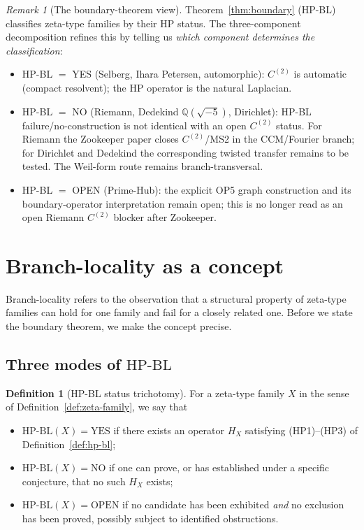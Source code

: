 \documentclass[11pt]{article}
\theoremstyle{definition}
\newtheorem{definition}[theorem]{Definition}
\theoremstyle{remark}
\newtheorem{remark}[theorem]{Remark}
\newcommand{\HBL}{\mathrm{HP\text{-}BL}}
\begin{document}
\begin{remark}[The boundary-theorem view]
\label{rem:boundary-three-component}
Theorem~\ref{thm:boundary} (HP-BL) classifies zeta-type families
by their HP status. The three-component decomposition refines this
by telling us \emph{which component determines the classification}:
\begin{itemize}
\item HP-BL $=$ YES (Selberg, Ihara Petersen, automorphic):
$C^{(2)}$ is automatic (compact resolvent); the HP operator is
the natural Laplacian.
\item HP-BL $=$ NO (Riemann, Dedekind $\mathbb{Q}(\sqrt{-5})$,
Dirichlet): HP-BL failure/no-construction is not identical with an
open $C^{(2)}$ status.  For Riemann the Zookeeper paper closes
$C^{(2)}$/MS2 in the CCM/Fourier branch; for Dirichlet and Dedekind
the corresponding twisted transfer remains to be tested.  The
Weil-form route remains branch-transversal.
\item HP-BL $=$ OPEN (Prime-Hub): the explicit OP5 graph construction
and its boundary-operator interpretation remain open; this is no
longer read as an open Riemann $C^{(2)}$ blocker after Zookeeper.
\end{itemize}
\end{remark}

\section{Branch-locality as a concept}
\label{sec:locality}

Branch-locality refers to the observation that a structural property
of zeta-type families can hold for one family and fail for a closely
related one. Before we state the boundary theorem, we make the
concept precise.

\subsection{Three modes of \texorpdfstring{$\HBL$}{HP-BL}}

\begin{definition}[HP-BL status trichotomy]\label{def:hpbl-status}
For a zeta-type family $X$ in the sense of Definition~\ref{def:zeta-family},
we say that
\begin{itemize}
\item $\HBL(X) = \mathrm{YES}$ if there exists an operator $H_X$
  satisfying (HP1)--(HP3) of Definition~\ref{def:hp-bl};
\item $\HBL(X) = \mathrm{NO}$ if one can prove, or has established
  under a specific conjecture, that no such $H_X$ exists;
\item $\HBL(X) = \mathrm{OPEN}$ if no candidate has been exhibited
  \emph{and} no exclusion has been proved, possibly subject to
  identified obstructions.
\end{itemize}
\end{definition}
\end{document}
